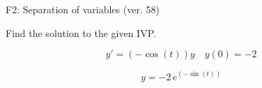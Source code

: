 \begin{exercise}
  \begin{exerciseTitle}F2: Separation of variables (ver. 58)\end{exerciseTitle}
  \begin{exerciseStatement}
    
Find the solution to the given IVP.

    
\[y'=( -\cos\left(t\right) )y\hspace{1em} y(0)= -2\]

  \end{exerciseStatement}
  \begin{exerciseAnswer}
    
\[y= -2 \, e^{\left(-\sin\left(t\right)\right)}\]

  \end{exerciseAnswer}
\end{exercise}